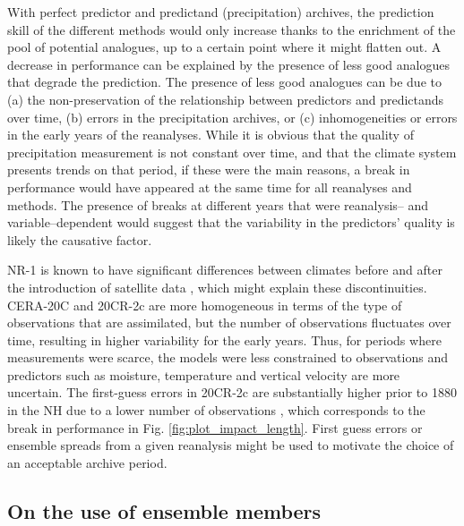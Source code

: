 \documentclass{ametsoc}
\begin{document}
	With perfect predictor and predictand (precipitation) archives, the prediction skill of the different methods would only increase thanks to the enrichment of the pool of potential analogues, up to a certain point where it might flatten out. A decrease in performance can be explained by the presence of less good analogues that degrade the prediction. The presence of less good analogues can be due to (a) the non-preservation of the relationship between predictors and predictands over time, (b) errors in the precipitation archives, or (c) inhomogeneities or errors in the early years of the reanalyses. While it is obvious that the quality of precipitation measurement is not constant over time, and that the climate system presents trends on that period, if these were the main reasons, a break in performance would have appeared at the same time for all reanalyses and methods. The presence of breaks at different years that were reanalysis-- and variable--dependent would suggest that the variability in the predictors' quality is likely the causative factor.
	
	NR-1 is known to have significant differences between climates before and after the introduction of satellite data \citep{Kistler2001}, which might explain these discontinuities. CERA-20C and 20CR-2c are more homogeneous in terms of the type of observations that are assimilated, but the number of observations fluctuates over time, resulting in higher variability for the early years. Thus, for periods where measurements were scarce, the models were less constrained to observations and predictors such as moisture, temperature and vertical velocity are more uncertain. The first-guess errors in 20CR-2c are substantially higher prior to 1880 in the NH due to a lower number of observations \citep{Compo2011}, which corresponds to the break in performance in Fig. \ref{fig:plot_impact_length}. First guess errors or ensemble spreads from a given reanalysis might be used to motivate the choice of an acceptable archive period.
	
	
	\subsection{On the use of ensemble members}
	\label{sec:ensemble}
	
\end{document}
